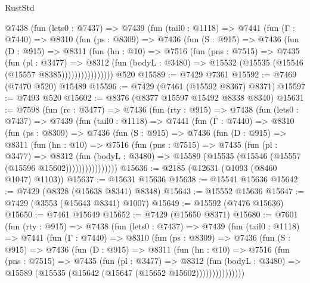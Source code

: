\begin{lexlean}{RustStd}
\begin{coremodule}
        @7438
          (fun (lets0 : @7437) =>
          @7439
            (fun (tail0 : @1118) =>
            @7441
              (fun (Γ : @7440) =>
              @8310
                (fun (ps : @8309) =>
                @7436
                  (fun (S : @915) =>
                  @7436
                    (fun (D : @915) =>
                    @8311
                      (fun (hn : @10) =>
                      @7516
                        (fun (pns : @7515) =>
                        @7435
                          (fun (pl : @3477) =>
                          @8312
                            (fun (bodyL : @3480) =>
                            @15532 (@15535 (@15546 (@15557 @8385))))))))))))))))
    @520
@15589 := @7429 @7361
@15592 := @7469 (@7470 @520) @15489
@15596 := @7429 (@7461 (@15592 @8367) @8371)
@15597 := @7493 @520
@15602 := @8376 (@8377 @15597 @15492 @8338 @8340)
@15631 := @7598
    (fun (rc : @3477) =>
    @7436
      (fun (rty : @915) =>
      @7438
        (fun (lets0 : @7437) =>
        @7439
          (fun (tail0 : @1118) =>
          @7441
            (fun (Γ : @7440) =>
            @8310
              (fun (ps : @8309) =>
              @7436
                (fun (S : @915) =>
                @7436
                  (fun (D : @915) =>
                  @8311
                    (fun (hn : @10) =>
                    @7516
                      (fun (pns : @7515) =>
                      @7435
                        (fun (pl : @3477) =>
                        @8312
                          (fun (bodyL : @3480) =>
                          @15589 (@15535 (@15546 (@15557 (@15596 @15602))))))))))))))))
@15636 := @2185 (@12631 (@1093 (@8460 @1047) @1103))
@15637 := @15631 @15636
@15638 := @15541 @15636
@15642 := @7429 (@8328 (@15638 @8341) @8348)
@15643 := @15552 @15636
@15647 := @7429 (@3553 (@15643 @8341) @1007)
@15649 := @15592 (@7476 @15636)
@15650 := @7461 @15649
@15652 := @7429 (@15650 @8371)
@15680 := @7601
    (fun (rty : @915) =>
    @7438
      (fun (lets0 : @7437) =>
      @7439
        (fun (tail0 : @1118) =>
        @7441
          (fun (Γ : @7440) =>
          @8310
            (fun (ps : @8309) =>
            @7436
              (fun (S : @915) =>
              @7436
                (fun (D : @915) =>
                @8311
                  (fun (hn : @10) =>
                  @7516
                    (fun (pns : @7515) =>
                    @7435
                      (fun (pl : @3477) =>
                      @8312
                        (fun (bodyL : @3480) =>
                        @15589 (@15535 (@15642 (@15647 (@15652 @15602)))))))))))))))

\end{coremodule}
\end{lexlean}
